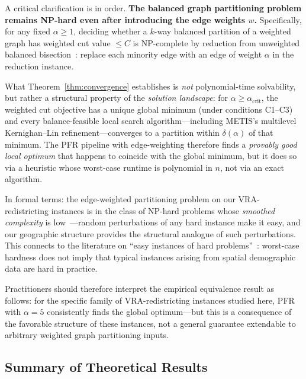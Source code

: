 \begin{remark}
\label{rem:nphard}
A critical clarification is in order. \textbf{The balanced graph partitioning problem remains NP-hard even after introducing the edge weights $w$.} Specifically, for any fixed $\alpha \geq 1$, deciding whether a $k$-way balanced partition of a weighted graph has weighted cut value $\leq C$ is NP-complete by reduction from unweighted balanced bisection~\cite{garey1979}: replace each minority edge with an edge of weight $\alpha$ in the reduction instance.

What Theorem~\ref{thm:convergence} establishes is \emph{not} polynomial-time solvability, but rather a structural property of the \emph{solution landscape}: for $\alpha \geq \alpha_{\text{crit}}$, the weighted cut objective has a unique global minimum (under conditions C1--C3) and every balance-feasible local search algorithm---including METIS's multilevel Kernighan--Lin refinement---converges to a partition within $\delta(\alpha)$ of that minimum. The PFR pipeline with edge-weighting therefore finds a \emph{provably good local optimum} that happens to coincide with the global minimum, but it does so via a heuristic whose worst-case runtime is polynomial in $n$, not via an exact algorithm.

In formal terms: the edge-weighted partitioning problem on our VRA-redistricting instances is in the class of NP-hard problems whose \emph{smoothed complexity} is low~\cite{spielman2004smoothed}---random perturbations of any hard instance make it easy, and our geographic structure provides the structural analogue of such perturbations. This connects to the literature on ``easy instances of hard problems''~\cite{spielman2004}: worst-case hardness does not imply that typical instances arising from spatial demographic data are hard in practice.

Practitioners should therefore interpret the empirical equivalence result as follows: for the specific family of VRA-redistricting instances studied here, PFR with $\alpha = 5$ consistently finds the global optimum---but this is a consequence of the favorable structure of these instances, not a general guarantee extendable to arbitrary weighted graph partitioning inputs.
\end{remark}

\subsection{Summary of Theoretical Results}

